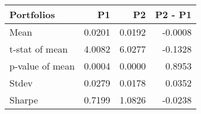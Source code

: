 \begin{tabular}{lrrr}
\toprule
Portfolios & P1 & P2 & P2 - P1 \\
\midrule
Mean & 0.0201 & 0.0192 & -0.0008 \\
t-stat of mean & 4.0082 & 6.0277 & -0.1328 \\
p-value of mean & 0.0004 & 0.0000 & 0.8953 \\
Stdev & 0.0279 & 0.0178 & 0.0352 \\
Sharpe & 0.7199 & 1.0826 & -0.0238 \\
\bottomrule
\end{tabular}
